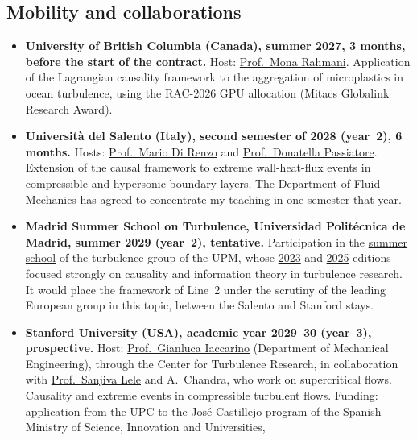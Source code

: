 \documentclass[11pt]{article}
\begin{document}
\subsection{Mobility and collaborations}\label{sec:mobility}
\begin{itemize}
  \item \textbf{University of British Columbia (Canada), summer 2027, 3 months, before
  the start of the contract.} Host:
  \href{https://chbe.ubc.ca/mona-rahmani/}{Prof.\ Mona Rahmani}. Application of the
  Lagrangian causality framework to the aggregation of microplastics in ocean turbulence,
  using the RAC-2026 GPU allocation (Mitacs Globalink Research Award).
  \item \textbf{Universit\`a del Salento (Italy), second semester of 2028 (year~2), 6
  months.} Hosts:
  \href{https://www.unisalento.it/scheda-utente/-/people/mario.direnzo}{Prof.\ Mario Di
  Renzo} and \href{https://www.unisalento.it/scheda-utente/-/people/donatella.passiatore}{Prof.\
  Donatella Passiatore}. Extension of the causal framework to extreme wall-heat-flux events
  in compressible and hypersonic boundary layers. The
  Department of Fluid Mechanics has agreed to concentrate my teaching in one semester that
  year.
  \item \textbf{Madrid Summer School on Turbulence, Universidad Polit\'ecnica de Madrid,
  summer 2029 (year~2), tentative.} Participation in the
  \href{https://torroja.dmt.upm.es/summer.html}{summer school} of the turbulence group of
  the UPM, whose
  \href{http://torroja.dmt.upm.es/summer23/}{2023} and
  \href{http://torroja.dmt.upm.es/summer25/}{2025} editions focused strongly on causality
  and information theory in turbulence research. It would place the framework of Line~2
  under the scrutiny of the leading European group in this topic, between the Salento and
  Stanford stays.
  \item \textbf{Stanford University (USA), academic year 2029--30 (year~3), prospective.}
  Host: \href{https://me.stanford.edu/people/gianluca-iaccarino}{Prof.\ Gianluca Iaccarino}
  (Department of Mechanical Engineering), through the Center for Turbulence Research, in
  collaboration with \href{https://me.stanford.edu/people/sanjiva-lele}{Prof.\ Sanjiva
  Lele} and A.\ Chandra, who work on supercritical flows. Causality and extreme events in
  compressible turbulent flows. Funding: application from the UPC to the
  \href{https://www.ciencia.gob.es/Convocatorias/2024/JoseCastillejo2024.html}{Jos\'e
  Castillejo program} of the Spanish Ministry of Science, Innovation and Universities,

\end{itemize}
\end{document}
